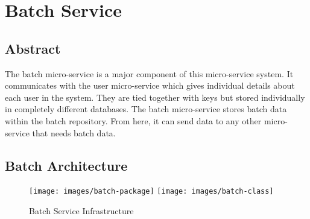 \chapter{Batch Service}
\section{Abstract}
The batch micro-service is a major component of this micro-service system. It communicates with the user micro-service which gives individual details about each user in the system. They are tied together with keys but stored individually in completely different databases. The batch micro-service stores batch data within the batch repository. From here, it can send data to any other micro-service that needs batch data.

\section{Batch Architecture}

\begin{figure}[htp]
\centering
\texttt{[image: images/batch-package]}
\texttt{[image: images/batch-class]}
\caption{Batch Service Infrastructure}
\label{fig:lion}
\end{figure}


